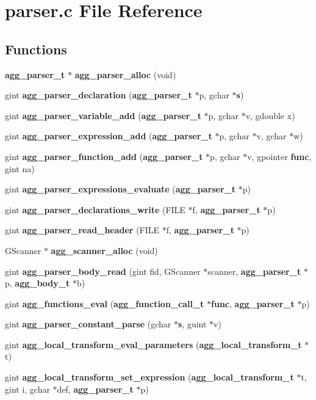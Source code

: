 \section{parser.\+c File Reference}
\label{parser_8c}
\subsection*{Functions}
{\bf }\par
\begin{DoxyCompactItemize}
\item 
{\bf agg\+\_\+parser\+\_\+t} $\ast$ {\bf agg\+\_\+parser\+\_\+alloc} (void)
\item 
gint {\bf agg\+\_\+parser\+\_\+declaration} ({\bf agg\+\_\+parser\+\_\+t} $\ast$p, gchar $\ast${\bf s})
\item 
gint {\bf agg\+\_\+parser\+\_\+variable\+\_\+add} ({\bf agg\+\_\+parser\+\_\+t} $\ast$p, gchar $\ast$v, gdouble x)
\item 
gint {\bf agg\+\_\+parser\+\_\+expression\+\_\+add} ({\bf agg\+\_\+parser\+\_\+t} $\ast$p, gchar $\ast$v, gchar $\ast$w)
\item 
gint {\bf agg\+\_\+parser\+\_\+function\+\_\+add} ({\bf agg\+\_\+parser\+\_\+t} $\ast$p, gchar $\ast$v, gpointer {\bf func}, gint na)
\item 
gint {\bf agg\+\_\+parser\+\_\+expressions\+\_\+evaluate} ({\bf agg\+\_\+parser\+\_\+t} $\ast$p)
\item 
gint {\bf agg\+\_\+parser\+\_\+declarations\+\_\+write} (F\+I\+L\+E $\ast$f, {\bf agg\+\_\+parser\+\_\+t} $\ast$p)
\item 
gint {\bf agg\+\_\+parser\+\_\+read\+\_\+header} (F\+I\+L\+E $\ast$f, {\bf agg\+\_\+parser\+\_\+t} $\ast$p)
\item 
G\+Scanner $\ast$ {\bf agg\+\_\+scanner\+\_\+alloc} (void)
\item 
gint {\bf agg\+\_\+parser\+\_\+body\+\_\+read} (gint fid, G\+Scanner $\ast$scanner, {\bf agg\+\_\+parser\+\_\+t} $\ast$p, {\bf agg\+\_\+body\+\_\+t} $\ast$b)
\item 
gint {\bf agg\+\_\+functions\+\_\+eval} ({\bf agg\+\_\+function\+\_\+call\+\_\+t} $\ast${\bf func}, {\bf agg\+\_\+parser\+\_\+t} $\ast$p)
\item 
gint {\bf agg\+\_\+parser\+\_\+constant\+\_\+parse} (gchar $\ast${\bf s}, guint $\ast$v)
\item 
gint {\bf agg\+\_\+local\+\_\+transform\+\_\+eval\+\_\+parameters} ({\bf agg\+\_\+local\+\_\+transform\+\_\+t} $\ast$t)
\item 
gint {\bf agg\+\_\+local\+\_\+transform\+\_\+set\+\_\+expression} ({\bf agg\+\_\+local\+\_\+transform\+\_\+t} $\ast$t, gint i, gchar $\ast$def, {\bf agg\+\_\+parser\+\_\+t} $\ast$p)
\end{DoxyCompactItemize}



